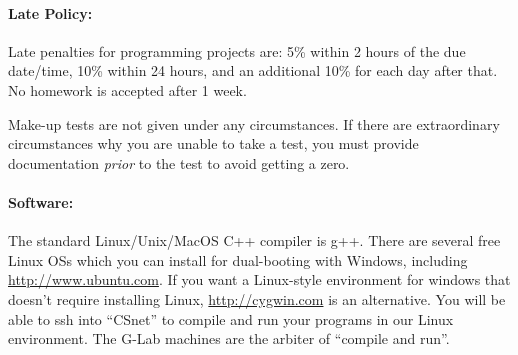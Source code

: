 \documentclass[10pt]{article}
\begin{document}
\paragraph*{\bf Late Policy:}
  Late penalties for programming projects are: 5\% within 2 hours of
  the due date/time, 10\% within 24 hours, and an additional 10\% for
  each day after that. 
  No homework is accepted after 1 week. 

  Make-up tests are not given under any circumstances.
  If there are extraordinary circumstances why you are unable to take 
  a test, you must provide documentation {\it prior} to the test to
  avoid getting a zero.

\paragraph*{\bf Software:}
  The standard Linux/Unix/MacOS C++ compiler is g++. 
  There are several free Linux OSs which you can install for
  dual-booting with Windows, including \url{http://www.ubuntu.com}. 
  If you want a Linux-style environment for windows that doesn't
  require installing Linux, \url{http://cygwin.com} is an
  alternative. You will be able to ssh into ``CSnet'' to compile and run
  your programs in our Linux environment. The G-Lab machines are the arbiter of
  ``compile and run''.
\end{document}
